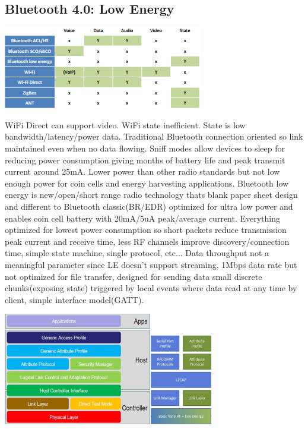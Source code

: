 \documentclass[9pt]{extarticle}
\begin{document}
\begin{multicols}{2}
\section{Bluetooth 4.0: Low Energy}

\includegraphics{srwaa.png}

WiFi Direct can support video. WiFi state inefficient. State is low bandwidth/latency/power data. Traditional Bluetooth connection oriented so link maintained even when no data flowing. Sniff modes allow devices to sleep for reducing power consumption giving months of battery life and peak transmit current around 25mA. Lower power than other radio standards but not low enough power for coin cells and energy harvesting applications. Bluetooth low energy is new/open/short range radio technology thats blank paper sheet design and different to Bluetooth classic(BR/EDR) optimized for ultra low power and enables coin cell battery with 20mA/5uA peak/average current. Everything optimized for lowest power consumption so short packets reduce transmission peak current and receive time, less RF channels improve discovery/connection time, simple state machine, single protocol, etc... Data throughput not a meaningful parameter since LE doesn't support streaming, 1Mbps data rate but not optimized for file transfer, designed for sending data small discrete chunks(exposing state) triggered by local events where data read at any time by client, simple interface model(GATT). 

\includegraphics{blearchitecture.png}\includegraphics{dualmodestack.png}


\end{multicols}
\end{document}

